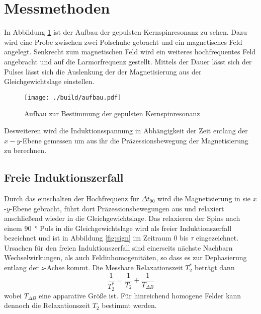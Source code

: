 \section{Messmethoden}%
\label{sec:messmethoden}
In Abbildung \ref{fig:aufbau} ist der Aufbau der gepulsten Kernspinresonanz zu
sehen. 
Dazu wird eine Probe zwischen zwei Polschuhe gebracht und ein magnetisches Feld
angelegt.
Senkrecht zum magnetischen Feld wird ein weiteres hochfrequentes Feld angebracht
und auf die Larmorfrequenz gestellt. 
Mittels der Dauer lässt sich der Pulses lässt sich die Auslenkung der
der Magnetisierung aus der Gleichgewichtslage einstellen. 
\begin{figure}[ht]
		\centering
		\texttt{[image: ./build/aufbau.pdf]}
		\caption{Aufbau zur Bestimmung der gepulsten Kernspinresonanz}
		\label{fig:aufbau}
\end{figure}
Desweiteren wird die Induktionsspannung in Abhängigkeit der Zeit entlang der $x-y$-Ebene gemessen um aus
ihr die Präzessionsbewegung der Magnetisierung zu berechnen.

\subsection{Freie Induktionszerfall}%
\label{sub:freie_induktionszerfall}
Durch das einschalten der Hochfrequenz für $\Delta t_{90}$ wird die
Magnetisierung in sie $x$-$y$-Ebene gebracht, führt dort Präzessionsbewegungen aus und 
relaxiert anschließend wieder in die Gleichgewichtslage. 
Das relaxieren der Spins nach einem \SI{90}{\degree} Puls in die
Gleichgewichtslage wird als freier Induktionszerfall bezeichnet und ist in
Abbildung \ref{fig:sign} im Zeitraum 0 bis $\tau$ eingezeichnet.
Ursachen für den freien Induktionszerfall sind einerseits nächste Nachbarn
Wechselwirkungen, als auch Feldinhomogenitäten, so dass es zur Dephasierung
entlang der $z$-Achse kommt.
Die Messbare Relaxationszeit $T_2^*$ beträgt dann
\begin{equation}
		\frac{1}{T_2^*} = \frac{1}{T_2} + \frac{1}{T_{\Delta B}}
\end{equation}
wobei $T_{\Delta B}$ eine apparative Größe ist. 
Für hinreichend homogene Felder kann dennoch die Relaxationszeit $T_2$ 
bestimmt werden. 
